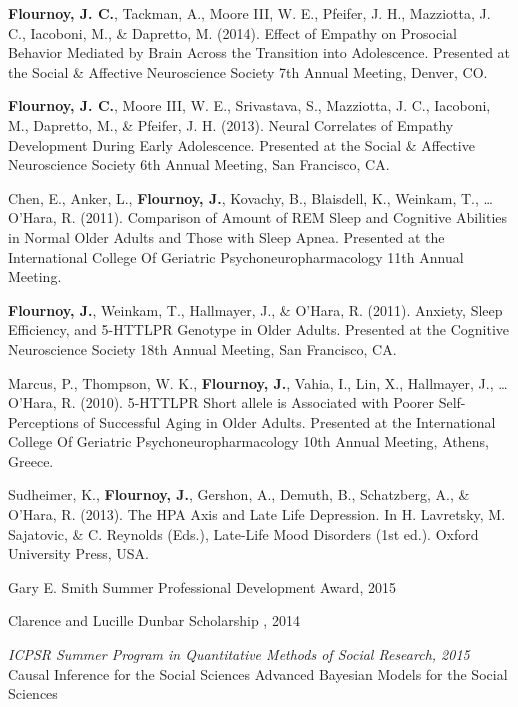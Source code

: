 \documentclass[11pt,article,oneside]{memoir}
\begin{document}
\ind \textbf{Flournoy, J. C.}, Tackman, A., Moore III, W. E., Pfeifer, J. H., Mazziotta, J. C., Iacoboni, M., \& Dapretto, M. (2014). Effect of Empathy on Prosocial Behavior Mediated by Brain Across the Transition into Adolescence. Presented at the Social \& Affective Neuroscience Society 7th Annual Meeting, Denver, CO.

\ind \textbf{Flournoy, J. C.}, Moore III, W. E., Srivastava, S., Mazziotta, J. C., Iacoboni, M., Dapretto, M., \& Pfeifer, J. H. (2013). Neural Correlates of Empathy Development During Early Adolescence. Presented at the Social \& Affective Neuroscience Society 6th Annual Meeting, San Francisco, CA.

\ind Chen, E., Anker, L., \textbf{Flournoy, J.}, Kovachy, B., Blaisdell, K., Weinkam, T., … O’Hara, R. (2011). Comparison of Amount of REM Sleep and Cognitive Abilities in Normal Older Adults and Those with Sleep Apnea. Presented at the International College Of Geriatric Psychoneuropharmacology 11th Annual Meeting.

\ind \textbf{Flournoy, J.}, Weinkam, T., Hallmayer, J., \& O’Hara, R. (2011). Anxiety, Sleep Efficiency, and 5-HTTLPR Genotype in Older Adults. Presented at the Cognitive Neuroscience Society 18th Annual Meeting, San Francisco, CA.

\ind Marcus, P., Thompson, W. K., \textbf{Flournoy, J.}, Vahia, I., Lin, X., Hallmayer, J., … O’Hara, R. (2010). 5-HTTLPR Short allele is Associated with Poorer Self-Perceptions of Successful Aging in Older Adults. Presented at the International College Of Geriatric Psychoneuropharmacology 10th Annual Meeting, Athens, Greece.

\medskip

\ind Sudheimer, K., \textbf{Flournoy, J.}, Gershon, A., Demuth, B., Schatzberg, A., \& O’Hara, R. (2013). The HPA Axis and Late Life Depression. In H. Lavretsky, M. Sajatovic, \& C. Reynolds (Eds.), Late-Life Mood Disorders (1st ed.). Oxford University Press, USA.


\bigskip
{}
\medskip

\ind Gary E. Smith Summer Professional Development Award, 2015

\ind Clarence and Lucille Dunbar Scholarship , 2014

\medskip

\ind \textit{ICPSR Summer Program in Quantitative Methods of Social Research, 2015}\newline 
Causal Inference for the Social Sciences\newline
Advanced Bayesian Models for the Social Sciences
\end{document}
